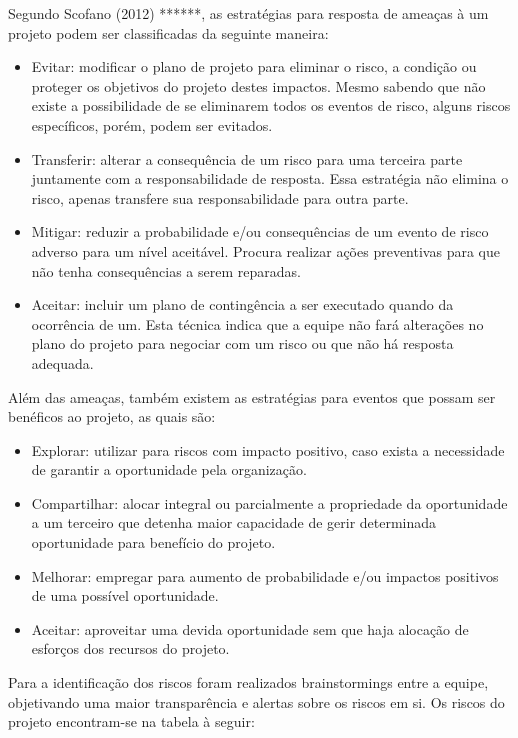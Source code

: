   Segundo Scofano (2012) ******, as estratégias para resposta de ameaças à um projeto podem ser classificadas da seguinte maneira:

  \begin{itemize}
    \item Evitar: modificar o plano de projeto para eliminar o risco, a condição ou proteger os objetivos do projeto destes
    impactos. Mesmo sabendo que não existe a possibilidade de se eliminarem todos os eventos de risco, alguns riscos
    específicos, porém, podem ser evitados.
    \item Transferir: alterar a consequência de um risco para uma terceira parte juntamente com a responsabilidade de
    resposta. Essa estratégia não elimina o risco, apenas transfere sua responsabilidade para outra parte.
    \item Mitigar: reduzir a probabilidade e/ou consequências de um evento de risco adverso para um nível aceitável. Procura
    realizar ações preventivas para que não tenha consequências a serem reparadas.
    \item Aceitar: incluir um plano de contingência a ser executado quando da ocorrência de um. Esta técnica indica que a equipe
    não fará alterações no plano do projeto para negociar com um risco ou que não há resposta adequada.
  \end{itemize}

  Além das ameaças, também existem as estratégias para eventos que possam ser benéficos ao projeto, as quais são:

  \begin{itemize}
    \item Explorar: utilizar para riscos com impacto positivo, caso exista a necessidade de garantir a oportunidade pela organização.
    \item Compartilhar: alocar integral ou parcialmente a propriedade da oportunidade a um terceiro que detenha maior
    capacidade de gerir determinada oportunidade para benefício do projeto.
    \item Melhorar: empregar para aumento de probabilidade e/ou impactos positivos de uma possível oportunidade.
    \item Aceitar: aproveitar uma devida oportunidade sem que haja alocação de esforços dos recursos do projeto.
  \end{itemize}

  Para a identificação dos riscos foram realizados brainstormings entre a equipe, objetivando uma maior transparência
  e alertas sobre os riscos em si. Os riscos do projeto encontram-se na tabela à seguir:

